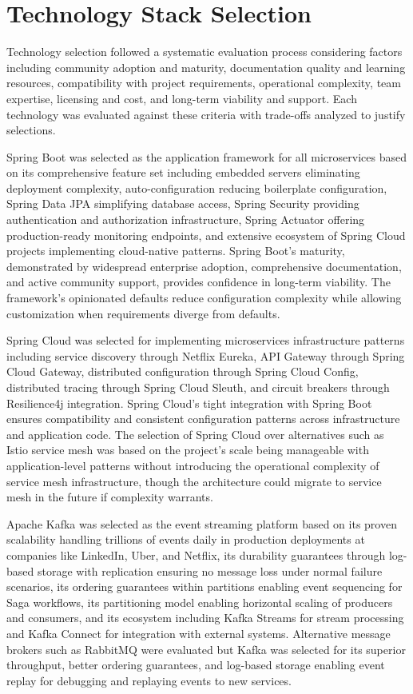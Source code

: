 \section{Technology Stack Selection}

Technology selection followed a systematic evaluation process considering factors including community adoption and maturity, documentation quality and learning resources, compatibility with project requirements, operational complexity, team expertise, licensing and cost, and long-term viability and support. Each technology was evaluated against these criteria with trade-offs analyzed to justify selections.

Spring Boot was selected as the application framework for all microservices based on its comprehensive feature set including embedded servers eliminating deployment complexity, auto-configuration reducing boilerplate configuration, Spring Data JPA simplifying database access, Spring Security providing authentication and authorization infrastructure, Spring Actuator offering production-ready monitoring endpoints, and extensive ecosystem of Spring Cloud projects implementing cloud-native patterns. Spring Boot's maturity, demonstrated by widespread enterprise adoption, comprehensive documentation, and active community support, provides confidence in long-term viability. The framework's opinionated defaults reduce configuration complexity while allowing customization when requirements diverge from defaults.

Spring Cloud was selected for implementing microservices infrastructure patterns including service discovery through Netflix Eureka, API Gateway through Spring Cloud Gateway, distributed configuration through Spring Cloud Config, distributed tracing through Spring Cloud Sleuth, and circuit breakers through Resilience4j integration. Spring Cloud's tight integration with Spring Boot ensures compatibility and consistent configuration patterns across infrastructure and application code. The selection of Spring Cloud over alternatives such as Istio service mesh was based on the project's scale being manageable with application-level patterns without introducing the operational complexity of service mesh infrastructure, though the architecture could migrate to service mesh in the future if complexity warrants.

Apache Kafka was selected as the event streaming platform based on its proven scalability handling trillions of events daily in production deployments at companies like LinkedIn, Uber, and Netflix, its durability guarantees through log-based storage with replication ensuring no message loss under normal failure scenarios, its ordering guarantees within partitions enabling event sequencing for Saga workflows, its partitioning model enabling horizontal scaling of producers and consumers, and its ecosystem including Kafka Streams for stream processing and Kafka Connect for integration with external systems. Alternative message brokers such as RabbitMQ were evaluated but Kafka was selected for its superior throughput, better ordering guarantees, and log-based storage enabling event replay for debugging and replaying events to new services.

